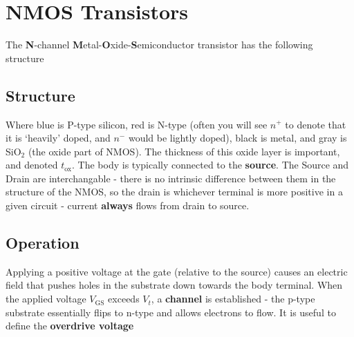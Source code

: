 \documentclass[11pt]{report}
\begin{document}
 \section{NMOS Transistors}

 The \textbf{N}-channel \textbf{M}etal-\textbf{O}xide-\textbf{S}emiconductor transistor has the following structure


 \begin{center}
 \end{center}

 \subsection{Structure}

 Where blue is P-type silicon, red is N-type (often you will see $n^+$ to denote that it is `heavily' doped, and $n^-$ would be lightly doped), black is metal, and gray is SiO$_2$ (the oxide part of NMOS). The thickness of this oxide layer is important, and denoted $t_{\text{ox}}$. The body is typically connected to the \textbf{source}. The Source and Drain are interchangable - there is no intrinsic difference between them in the structure of the NMOS, so the drain is whichever terminal is more positive in a given circuit - current \textbf{always} flows from drain to source.

 \subsection{Operation}
 Applying a positive voltage at the gate (relative to the source) causes an electric field that pushes holes in the substrate down towards the body terminal. When the applied voltage $V_{\text{GS}}$ exceeds $V_t$, a \textbf{channel} is established - the p-type substrate essentially flips to n-type and allows electrons to flow. It is useful to define the \textbf{overdrive voltage}
\end{document}

